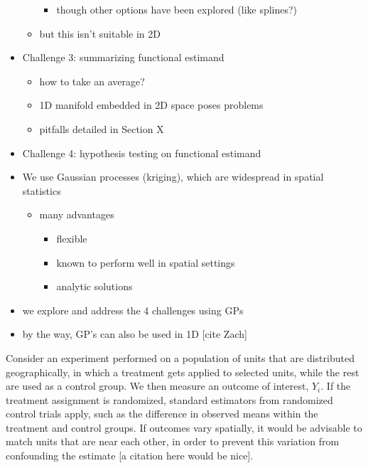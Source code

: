 \documentclass[letter]{article}
\providecommand{\tightlist}{%
      \setlength{\itemsep}{0pt}\setlength{\parskip}{0pt}}
\providecommand{\tightlist}{%
  	  \setlength{\itemsep}{0pt}\setlength{\parskip}{0pt}}
\begin{document}
\begin{itemize}
\begin{itemize}
    \begin{itemize}
    \tightlist
    \item
      though other options have been explored (like splines?)
    \end{itemize}
  \item
    but this isn't suitable in 2D
  \end{itemize}
\item
  Challenge 3: summarizing functional estimand

  \begin{itemize}
  \tightlist
  \item
    how to take an average?
  \item
    1D manifold embedded in 2D space poses problems
  \item
    pitfalls detailed in Section X
  \end{itemize}
\item
  Challenge 4: hypothesis testing on functional estimand
\item
  We use Gaussian processes (kriging), which are widespread in spatial statistics

  \begin{itemize}
  \tightlist
  \item
    many advantages

    \begin{itemize}
    \tightlist
    \item
      flexible
    \item
      known to perform well in spatial settings
    \item
      analytic solutions
    \end{itemize}
  \end{itemize}
\item
  we explore and address the 4 challenges using GPs
\item
  by the way, GP's can also be used in 1D {[}cite Zach{]}
\end{itemize}
    


    	Consider an experiment performed on a population of units that are distributed geographically,
in which a treatment gets applied to selected units, while the rest are used as a control group.
We then measure an outcome of interest, \(Y_i\).
If the treatment assignment is randomized, standard estimators from randomized control trials apply, such as the difference in observed means within the treatment and control groups.
If outcomes vary spatially, it would be advisable to match units that are near each other, in order to prevent this variation from confounding the estimate {[}a citation here would be nice{]}.
\end{document}
